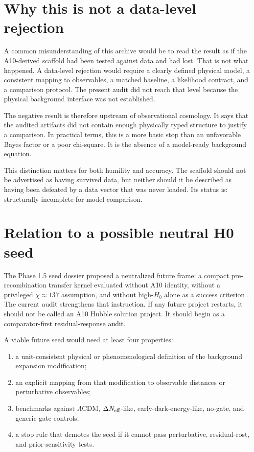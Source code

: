 \documentclass[11pt,a4paper]{article}
\newcommand{\LCDM}{$\Lambda$CDM}
\begin{document}
\section{Why this is not a data-level rejection}

A common misunderstanding of this archive would be to read the result as if the A10-derived scaffold had been tested against data and had lost. That is not what happened. A data-level rejection would require a clearly defined physical model, a consistent mapping to observables, a matched baseline, a likelihood contract, and a comparison protocol. The present audit did not reach that level because the physical background interface was not established.

The negative result is therefore upstream of observational cosmology. It says that the audited artifacts did not contain enough physically typed structure to justify a comparison. In practical terms, this is a more basic stop than an unfavorable Bayes factor or a poor chi-square. It is the absence of a model-ready background equation.

This distinction matters for both humility and accuracy. The scaffold should not be advertised as having survived data, but neither should it be described as having been defeated by a data vector that was never loaded. Its status is: structurally incomplete for model comparison.

\section{Relation to a possible neutral H0 seed}

The Phase 1.5 seed dossier proposed a neutralized future frame: a compact pre-recombination transfer kernel evaluated without A10 identity, without a privileged $\chi \approx 137$ assumption, and without high-$H_0$ alone as a success criterion \cite{SeedDossier2026}. The current audit strengthens that instruction. If any future project restarts, it should not be called an A10 Hubble solution project. It should begin as a comparator-first residual-response audit.

A viable future seed would need at least four properties:

\begin{enumerate}[leftmargin=7mm]
\item a unit-consistent physical or phenomenological definition of the background expansion modification;
\item an explicit mapping from that modification to observable distances or perturbative observables;
\item benchmarks against \LCDM, $\Delta N_{\rm eff}$-like, early-dark-energy-like, no-gate, and generic-gate controls;
\item a stop rule that demotes the seed if it cannot pass perturbative, residual-cost, and prior-sensitivity tests.
\end{enumerate}
\end{document}
